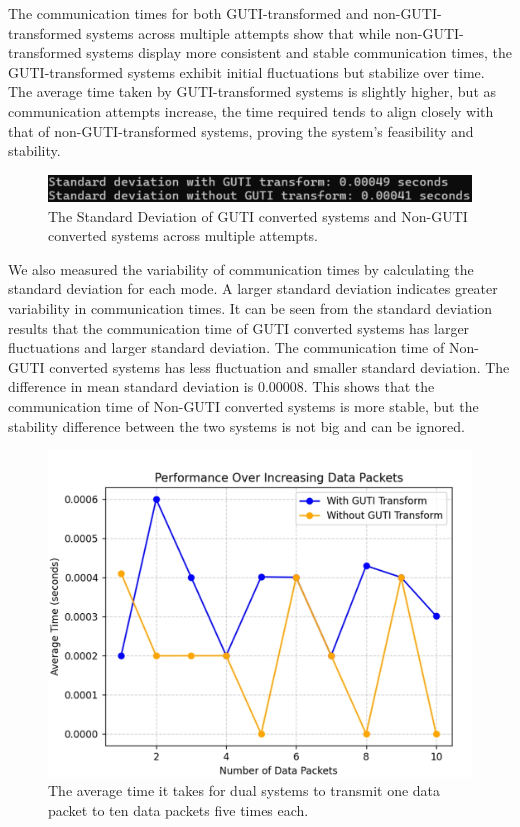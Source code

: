 \documentclass[sigplan,screen]{acmart}
\begin{document}
The communication times for both GUTI-transformed and non-GUTI-transformed systems across multiple attempts show that while non-GUTI-transformed systems display more consistent and stable communication times, the GUTI-transformed systems exhibit initial fluctuations but stabilize over time. The average time taken by GUTI-transformed systems is slightly higher, but as communication attempts increase, the time required tends to align closely with that of non-GUTI-transformed systems, proving the system’s feasibility and stability.

\begin{figure}[htbp]
\centering
\includegraphics[width=\linewidth]{standardDeviation.png}
\caption{The Standard Deviation of GUTI converted systems and Non-GUTI converted systems across multiple attempts.}
\end{figure}

We also measured the variability of communication times by calculating the standard deviation for each mode. A larger standard deviation indicates greater variability in communication times. It can be seen from the standard deviation results that the communication time of GUTI converted systems has larger fluctuations and larger standard deviation. The communication time of Non-GUTI converted systems has less fluctuation and smaller standard deviation. The difference in mean standard deviation is 0.00008. This shows that the communication time of Non-GUTI converted systems is more stable, but the stability difference between the two systems is not big and can be ignored.

\begin{figure}[htbp]
\centering
\includegraphics[width=\linewidth]{performanceIncrease.png}
\caption{The average time it takes for dual systems to transmit one data packet to ten data packets five times each.}
\end{figure}
\end{document}
